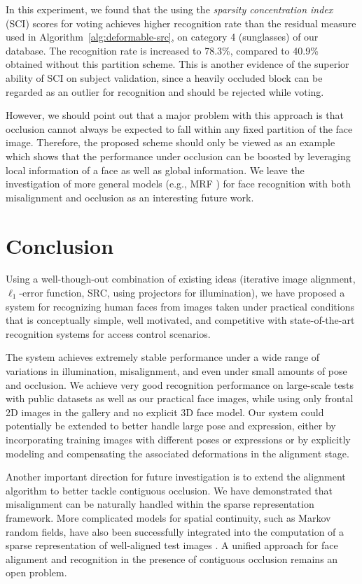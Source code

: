 \documentclass[10pt,journal,letterpaper,compsoc]{IEEEtran}
\begin{document}
In this experiment, we found that the using the \emph{sparsity
concentration index} (SCI) scores for voting achieves higher
recognition rate than the residual measure used in Algorithm~\ref{alg:deformable-src}, on
category 4 (sunglasses) of our database. The recognition rate
is increased to 78.3\%, compared to 40.9\% obtained without
this partition scheme. This is another evidence of the superior
ability of SCI on subject validation, since a heavily occluded
block can be regarded as an outlier for recognition and should
be rejected while voting.

However, we should point out that a major problem with this
approach is that occlusion cannot always be expected to fall within
 any fixed partition of the face image. Therefore, the
proposed scheme should only be viewed as an example which shows
that the performance under occlusion can be boosted by
leveraging local information of a face as well as global information. We
leave the investigation of more general models (e.g., MRF \cite{ZhouZ2009}) for face
recognition with both misalignment and occlusion as an
interesting future work.

\section{Conclusion}\label{sec:conclusion}
Using a well-though-out combination of existing ideas
(iterative image alignment, $\ell_1$-error function, SRC, using projectors for
illumination), we have proposed a system for recognizing human faces
from images taken under practical conditions that is conceptually simple, well
motivated, and competitive with state-of-the-art recognition systems for access
control scenarios.

The system achieves extremely stable performance under
a wide range of variations in illumination, misalignment, and even under small amounts of
pose and occlusion. We achieve very good recognition performance on
large-scale tests with public datasets as well as our practical face
images, while using only frontal 2D images in the gallery and no
explicit 3D face model.
Our system could potentially be extended to better handle large pose
and expression, either by incorporating training images with different poses or
expressions or by explicitly modeling and compensating the associated deformations
in the alignment stage.

Another important direction for future
investigation is to extend the alignment algorithm to better
tackle contiguous occlusion. We have demonstrated that misalignment can be naturally handled within the
sparse representation framework. More complicated models for
spatial continuity, such as Markov random fields, have also
been successfully integrated into the computation of a sparse
representation of well-aligned test images
\cite{Cevher2008-NIPS, ZhouZ2009}. A unified approach
for face alignment and recognition in the presence of
contiguous occlusion remains an open problem.
\end{document}

